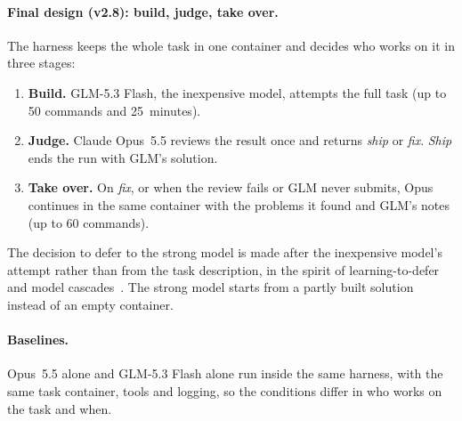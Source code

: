 \paragraph{Final design (v2.8): build, judge, take over.}
The harness keeps the whole task in one container and decides who works on it in three stages:
\begin{enumerate}
  \item \textbf{Build.} GLM-5.3 Flash, the inexpensive model, attempts the full task (up to 50 commands and
  25~minutes).
  \item \textbf{Judge.} Claude Opus~5.5 reviews the result once and returns \emph{ship} or \emph{fix}.
  \textit{Ship} ends the run with GLM's solution.
  \item \textbf{Take over.} On \emph{fix}, or when the review fails or GLM never submits, Opus continues in the
  same container with the problems it found and GLM's notes (up to 60 commands).
\end{enumerate}
The decision to defer to the strong model is made after the inexpensive model's attempt rather than from the
task description, in the spirit of learning-to-defer and model cascades~\cite{chen2023frugalgpt}. The strong
model starts from a partly built solution instead of an empty container.

\paragraph{Baselines.}
Opus~5.5 alone and GLM-5.3 Flash alone run inside the same harness, with the same task container, tools and
logging, so the conditions differ in who works on the task and when.
